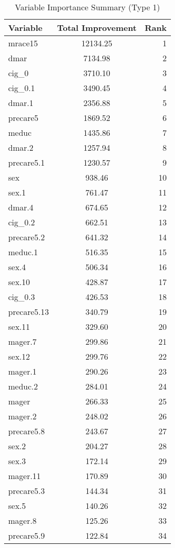 \begingroup
\begin{table}[htbp]
\centering
\setlength{\tabcolsep}{0.5em}
\renewcommand{\arraystretch}{0.9}
\footnotesize
\caption{Variable Importance Summary (Type 1)}
\label{tab:var_imp_summary_type1_optimized}
\begin{tabular}{lcr}
\hline
Variable & Total Improvement & Rank \\ \hline
mrace15 & 12134.25 & 1 \\
dmar & 7134.98 & 2 \\
cig_0 & 3710.10 & 3 \\
cig_0.1 & 3490.45 & 4 \\
dmar.1 & 2356.88 & 5 \\
precare5 & 1869.52 & 6 \\
meduc & 1435.86 & 7 \\
dmar.2 & 1257.94 & 8 \\
precare5.1 & 1230.57 & 9 \\
sex & 938.46 & 10 \\
sex.1 & 761.47 & 11 \\
dmar.4 & 674.65 & 12 \\
cig_0.2 & 662.51 & 13 \\
precare5.2 & 641.32 & 14 \\
meduc.1 & 516.35 & 15 \\
sex.4 & 506.34 & 16 \\
sex.10 & 428.87 & 17 \\
cig_0.3 & 426.53 & 18 \\
precare5.13 & 340.79 & 19 \\
sex.11 & 329.60 & 20 \\
mager.7 & 299.86 & 21 \\
sex.12 & 299.76 & 22 \\
mager.1 & 290.26 & 23 \\
meduc.2 & 284.01 & 24 \\
mager & 266.33 & 25 \\
mager.2 & 248.02 & 26 \\
precare5.8 & 243.67 & 27 \\
sex.2 & 204.27 & 28 \\
sex.3 & 172.14 & 29 \\
mager.11 & 170.89 & 30 \\
precare5.3 & 144.34 & 31 \\
sex.5 & 140.26 & 32 \\
mager.8 & 125.26 & 33 \\
precare5.9 & 122.84 & 34 \\

\end{tabular}
\end{table}
